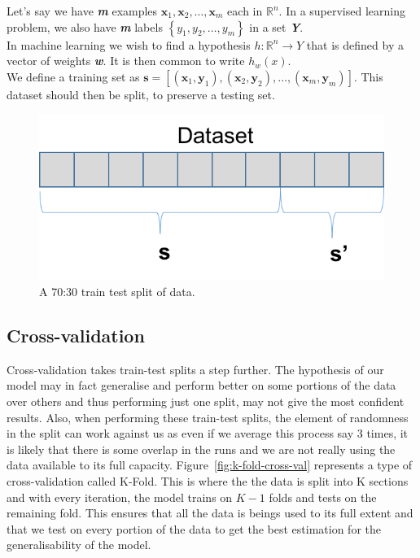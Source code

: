 \documentclass[12pt,a4paper,twoside]{report}
\begin{document}
Let's say we have \textbf{\textit{m}} examples $ \mathbf { x } _ { 1} ,\mathbf { x } _ { 2} ,\dots ,\mathbf { x } _ { m }$ each in $\mathbb { R } ^ { n }$. In a supervised learning problem, we also have \textbf{\textit{m}} labels $\left\{ y _ { 1} ,y _ { 2} ,\dots ,y _ { m } \right\}$ in a set \textbf{\textit{Y}}.\\
In machine learning we wish to find a hypothesis $h : \mathbb { R } ^ { n } \rightarrow Y$ that is defined by a vector of weights \textbf{\textit{w}}. It is then common to write $h _ { w } ( x )$.\\

We define a training set as $\mathbf{s} = [(\mathbf { x } _ { 1}, \mathbf { y } _ { 1}),(\mathbf { x } _ { 2}, \mathbf { y } _ { 2}),\dots,(\mathbf { x } _ { m}, \mathbf { y } _ { m})]$. This dataset should then be split, to preserve a testing set.
 
\begin{figure}[H]

\centering
\includegraphics[scale=0.8]{train-test-split}
\caption{A 70:30 train test split of data.}
\end{figure}

\subsection{Cross-validation}

Cross-validation takes train-test splits a step further. The hypothesis of our model may in fact generalise and perform better on some portions of the data over others and thus performing just one split, may not give the most confident results. Also, when performing these train-test splits, the element of randomness in the split can work against us as even if we average this process say 3 times, it is likely that there is some overlap in the runs and we are not really using the data available to its full capacity. Figure~\ref{fig:k-fold-cross-val} represents a type of cross-validation called K-Fold. This is where the the data is split into K sections and with every iteration, the model trains on $K-1$ folds and tests on the remaining fold. This ensures that all the data is beings used to its full extent and that we test on every portion of the data to get the best estimation for the generalisability of the model.
\end{document}
